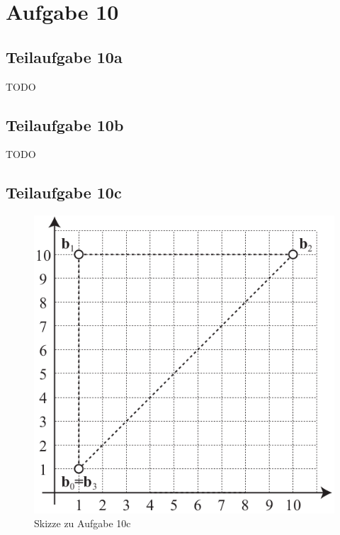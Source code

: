 \documentclass[a4paper]{scrartcl}
\begin{document}
\section*{Aufgabe 10}
\subsection*{Teilaufgabe 10a}
TODO

\subsection*{Teilaufgabe 10b}
TODO

\subsection*{Teilaufgabe 10c}
\begin{figure}[h]
    \centering
    \includegraphics*[width=0.8\linewidth, keepaspectratio]{10c.png}
    \caption{Skizze zu Aufgabe 10c}
    \label{fig:10c}
\end{figure}
\end{document}
